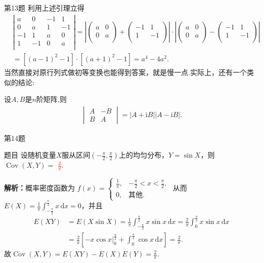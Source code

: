\documentclass[aspectratio=169]{beamer}
\begin{document}
\begin{frame}{第13题}
利用上述引理立得
\begin{align*}
&\left| \begin{matrix}
a&		0&		-1&		1\\
0&		a&		1&		-1\\
-1&		1&		a&		0\\
1&		-1&		0&		a\\
\end{matrix} \right|=\left| \left( \begin{matrix}
a&		0\\
0&		a\\
\end{matrix} \right) +\left( \begin{matrix}
-1&		1\\
1&		-1\\
\end{matrix} \right) \right|\cdot \left| \left( \begin{matrix}
a&		0\\
0&		a\\
\end{matrix} \right) -\left( \begin{matrix}
-1&		1\\
1&		-1\\
\end{matrix} \right) \right|
\\
&=\left[ \left( a-1 \right) ^2-1 \right] \cdot \left[ \left( a+1 \right) ^2-1 \right] =a^4-4a^2.
\end{align*}
当然直接对原行列式做初等变换也能得到答案，就是慢一点.实际上，还有一个类似的结论:

设\(A,B\)是\(n\)阶矩阵,则
\begin{gather*}
\begin{vmatrix}
A & -B\\
B & A
\end{vmatrix}=|A + \mathrm{i}B||A - \mathrm{i}B|.
\end{gather*}
\end{frame}

\begin{frame}{第14题}
\begin{block}{题目}
设随机变量$X$服从区间$\left(-\frac{\pi}{2},\frac{\pi}{2}\right)$上的均匀分布，$Y=\sin X$，则 $\operatorname{Cov}(X,Y)=$ \underline{\textcolor{red}{$\frac{2}{\pi}$}}.
\end{block}
\textbf{解析：}概率密度函数为
$f(x)=
\begin{cases}
\frac{1}{\pi}, & -\frac{\pi}{2}<x<\frac{\pi}{2},\\
0, & \text{其他}.
\end{cases}$
从而$E(X)=\frac{1}{\pi}\int_{-\frac{\pi}{2}}^{\frac{\pi}{2}}x\,\mathrm{d}x=0$，并且
\begin{align*}
E(XY)&=E(X\sin X)=\frac{1}{\pi}\int_{-\frac{\pi}{2}}^{\frac{\pi}{2}}x\sin x\,\mathrm{d}x
=\frac{2}{\pi}\int_0^{\frac{\pi}{2}}x\sin x\,\mathrm{d}x
\\
&=\frac{2}{\pi}\left[-x\cos x\Big |_0^{\frac{\pi}{2}}+\int_0^{\frac{\pi}{2}}\cos x\,\mathrm{d}x\right]
=\frac{2}{\pi}.
\end{align*}
故$\operatorname{Cov}(X,Y)=E(XY)-E(X)E(Y)=\frac{2}{\pi}.$
\end{frame}
\end{document}
